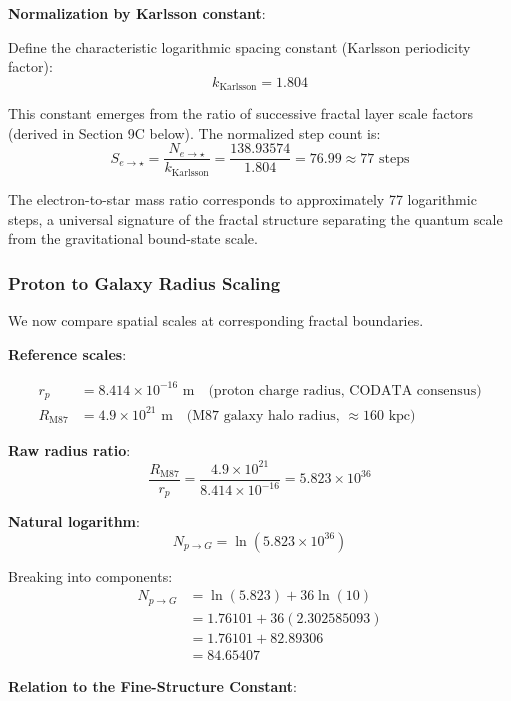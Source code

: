 \documentclass[11pt,a4paper]{article}
\begin{document}
      \noindent\textbf{Normalization by Karlsson constant}:

        Define the characteristic logarithmic spacing constant (Karlsson periodicity factor):
        \[
        k_{\text{Karlsson}} = 1.804
        \]

        This constant emerges from the ratio of successive fractal layer scale factors (derived in Section 9C below). The normalized step count is:
        \[
        S_{e \to \star} = \frac{N_{e \to \star}}{k_{\text{Karlsson}}} = \frac{138.93574}{1.804} = 76.99 \approx \boxed{77 \text{ steps}}
        \]

        The electron-to-star mass ratio corresponds to approximately 77 logarithmic steps, a universal signature of the fractal structure separating the quantum scale from the gravitational bound-state scale.

    \subsubsection{Proton to Galaxy Radius Scaling}

      We now compare spatial scales at corresponding fractal boundaries.

      \noindent\textbf{Reference scales}:

        \begin{align*}
        r_p &= 8.414 \times 10^{-16} \text{ m} \quad \text{(proton charge radius, CODATA consensus)}\\
        R_{\text{M87}} &= 4.9 \times 10^{21} \text{ m} \quad \text{(M87 galaxy halo radius, $\approx 160$ kpc)}
        \end{align*}

      \noindent\textbf{Raw radius ratio}:
        \[
        \frac{R_{\text{M87}}}{r_p} = \frac{4.9 \times 10^{21}}{8.414 \times 10^{-16}} = 5.823 \times 10^{36}
        \]

      \noindent\textbf{Natural logarithm}:
        \[
        N_{p \to G} = \ln(5.823 \times 10^{36})
        \]

        Breaking into components:
        \begin{align*}
        N_{p \to G} &= \ln(5.823) + 36 \ln(10)\\
        &= 1.76101 + 36(2.302585093)\\
        &= 1.76101 + 82.89306\\
        &= 84.65407
        \end{align*}

      \noindent\textbf{Relation to the Fine-Structure Constant}:
\end{document}
